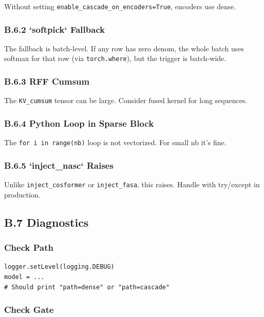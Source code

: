 Without setting \texttt{enable\_cascade\_on\_encoders=True}, encoders use dense.

\subsubsection{B.6.2 `softpick` Fallback}

The fallback is batch-level. If any row has zero denom, the whole batch 
uses softmax for that row (via \texttt{torch.where}), but the trigger is 
batch-wide.

\subsubsection{B.6.3 RFF Cumsum}

The \texttt{KV\_cumsum} tensor can be large. Consider fused kernel for long 
sequences.

\subsubsection{B.6.4 Python Loop in Sparse Block}

The \texttt{for i in range(nb)} loop is not vectorized. For small nb it's fine.

\subsubsection{B.6.5 `inject\_nasc` Raises}

Unlike \texttt{inject\_cosformer} or \texttt{inject\_fasa}, this raises. Handle with 
try/except in production.

\subsection{B.7 Diagnostics}

\subsubsection{Check Path}

\begin{lstlisting}
logger.setLevel(logging.DEBUG)
model = ...
# Should print "path=dense" or "path=cascade"
\end{lstlisting}

\subsubsection{Check Gate}

